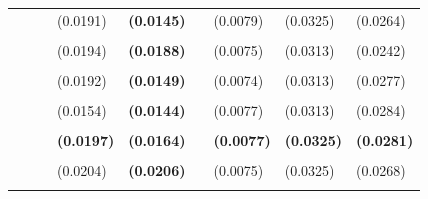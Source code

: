 \documentclass[
  12pt,
]{article}
\begin{document}
\begin{table}[H]
{\begin{tabular}[t]{llll>{}lllll}
 &  &  & (0.0191) & \textbf{(0.0145)} &  & (0.0079) & (0.0325) & (0.0264)\\
\addlinespace
\cellcolor{gray!6}{c.bn6} & \cellcolor{gray!6}{-132.7915} & \cellcolor{gray!6}{-139.1742} & \cellcolor{gray!6}{0.6835} & \textbf{\cellcolor{gray!6}{0.6113}} & \cellcolor{gray!6}{0.4710} & \cellcolor{gray!6}{0.4371} & \cellcolor{gray!6}{0.2830} & \cellcolor{gray!6}{0.2712}\\
 &  &  & (0.0194) & \textbf{(0.0188)} &  & (0.0075) & (0.0313) & (0.0242)\\
\addlinespace
\cellcolor{gray!6}{c.bn2.r15} & \cellcolor{gray!6}{-83.9469} & \cellcolor{gray!6}{-90.3297} & \cellcolor{gray!6}{0.6749} & \textbf{\cellcolor{gray!6}{0.6047}} & \cellcolor{gray!6}{0.1349} & \cellcolor{gray!6}{0.4761} & \cellcolor{gray!6}{0.3302} & \cellcolor{gray!6}{0.3357}\\
 &  &  & (0.0192) & \textbf{(0.0149)} &  & (0.0074) & (0.0313) & (0.0277)\\
\addlinespace
\cellcolor{gray!6}{c.poly4.r20} & \cellcolor{gray!6}{3.5738} & \cellcolor{gray!6}{-2.8090} & \cellcolor{gray!6}{0.5772} & \textbf{\cellcolor{gray!6}{0.6011}} & \cellcolor{gray!6}{0.1651} & \cellcolor{gray!6}{0.4980} & \cellcolor{gray!6}{0.3302} & \cellcolor{gray!6}{0.3570}\\
 &  &  & (0.0154) & \textbf{(0.0144)} &  & (0.0077) & (0.0313) & (0.0284)\\
\addlinespace
\textbf{\cellcolor{gray!6}{BIS Basel gap}} & \textbf{\cellcolor{gray!6}{-121.5910}} & \textbf{\cellcolor{gray!6}{-127.9738}} & \textbf{\cellcolor{gray!6}{0.6733}} & \textbf{\textbf{\cellcolor{gray!6}{0.5960}}} & \textbf{\cellcolor{gray!6}{3.0578}} & \textbf{\cellcolor{gray!6}{0.4441}} & \textbf{\cellcolor{gray!6}{0.3255}} & \textbf{\cellcolor{gray!6}{0.3032}}\\
\textbf{} & \textbf{} & \textbf{} & \textbf{(0.0197)} & \textbf{\textbf{(0.0164)}} & \textbf{} & \textbf{(0.0077)} & \textbf{(0.0325)} & \textbf{(0.0281)}\\
\addlinespace
\cellcolor{gray!6}{c.bn4} & \cellcolor{gray!6}{-169.1186} & \cellcolor{gray!6}{-175.5014} & \cellcolor{gray!6}{0.6892} & \textbf{\cellcolor{gray!6}{0.5943}} & \cellcolor{gray!6}{1.2840} & \cellcolor{gray!6}{0.3837} & \cellcolor{gray!6}{0.3255} & \cellcolor{gray!6}{0.2532}\\
 &  &  & (0.0204) & \textbf{(0.0206)} &  & (0.0075) & (0.0325) & (0.0268)\\
\addlinespace
\cellcolor{gray!6}{c.stm.r15} & \cellcolor{gray!6}{-79.5531} & \cellcolor{gray!6}{-85.9358} & \cellcolor{gray!6}{0.6575} & \textbf{\cellcolor{gray!6}{0.5924}} & \cellcolor{gray!6}{2.0027} & \cellcolor{gray!6}{0.4778} & \cellcolor{gray!6}{0.3160} & \cellcolor{gray!6}{0.3281}\\

\end{tabular}}
\end{table}
\end{document}
